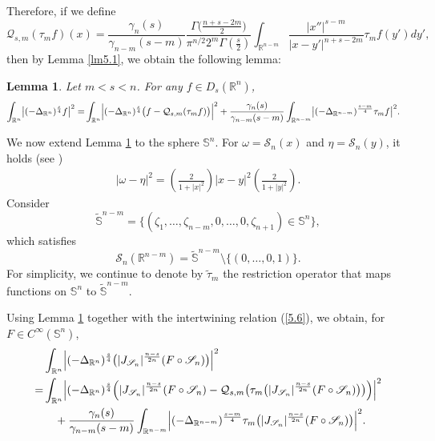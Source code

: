\documentclass[12pt,reqno]{amsart}%
\theoremstyle{plain}
\newtheorem{lemma}{Lemma}[section]
\numberwithin{equation}{section}
\begin{document}
Therefore, if we define
\[
\mathcal{Q}_{s,m}(\tau_{m}f)(x)=\frac{\gamma_{n}(s)}{\gamma_{n-m}(s-m)}
\frac{\Gamma\bigl(\frac{n+s-2m}{2}\bigr)}{\pi^{n/2}2^{m}\Gamma(\frac{s}{2})}
\int_{\mathbb{R}^{n-m}}\frac{|x''|^{s-m}}{|x-y'|^{n+s-2m}}
\tau_{m}f(y')dy',
\]
then by Lemma \ref{lm5.1}, we obtain the following lemma:
\begin{lemma}\label{lm5.2}
Let \(m<s< n\). For any \(f\in D_{s}(\mathbb{R}^{n})\),
\begin{align*}
\int_{\mathbb{R}^{n}}\bigl|(-\Delta_{\mathbb{R}^{n}})^{\frac{s}{4}}f\bigr|^{2}
=& \int_{\mathbb{R}^{n}}\Bigl|(-\Delta_{\mathbb{R}^{n}})^{\frac{s}{4}}\bigl(f-
\mathcal{Q}_{s,m}(\tau_{m}f)\bigr)\Bigr|^{2}
+ \frac{\gamma_{n}(s)}{\gamma_{n-m}(s-m)}
\int_{\mathbb{R}^{n-m}}\bigl|(-\Delta_{\mathbb{R}^{n-m}})^{\frac{s-m}{4}}\tau_{m}f\bigr|^{2}.
\end{align*}
\end{lemma}

We now extend Lemma \ref{lm5.2} to the sphere \(\mathbb{S}^{n}\).
For \(\omega = \mathscr{S}_{n}(x)\) and \(\eta = \mathscr{S}_{n}(y)\), it holds (see \cite{lieb2})
\begin{align}\label{5.5}
|\omega - \eta|^2 = \left( \frac{2}{1+|x|^2} \right) |x - y|^2 \left( \frac{2}{1+|y|^2} \right).
\end{align}
Consider
\[
\widetilde{\mathbb{S}}^{n-m}
= \bigl\{(\zeta_{1},\dots,\zeta_{n-m},0,\dots,0,\zeta_{n+1})\in \mathbb{S}^{n} \bigr\},
\]
which satisfies
\[
\mathscr{S}_{n}(\mathbb{R}^{n-m}) = \widetilde{\mathbb{S}}^{n-m}\setminus\{(0,\dots,0,1)\}.
\]
For simplicity, we continue to denote by \(\widetilde{\tau}_{m}\) the restriction operator that maps  functions  on \(\mathbb{S}^{n}\) to \(\widetilde{\mathbb{S}}^{n-m}\).

 Using Lemma \ref{lm5.2} together with the intertwining relation (\ref{5.6}), we obtain, for $F\in C^{\infty}(\mathbb{S}^{n})$,
\begin{align*}
&\int_{\mathbb{R}^{n}}\Bigl|(-\Delta_{\mathbb{R}^{n}})^{\frac{s}{4}}\bigl( |J_{\mathscr{S}_{n}}|^{\frac{n-s}{2n}} (F \circ \mathscr{S}_{n}) \bigr)\Bigr|^{2}\\
=& \int_{\mathbb{R}^{n}}\Bigl|(-\Delta_{\mathbb{R}^{n}})^{\frac{s}{4}}\Bigl( |J_{\mathscr{S}_{n}}|^{\frac{n-s}{2n}} (F \circ \mathscr{S}_{n}) -
\mathcal{Q}_{s,m}\bigl(\tau_{m}\bigl( |J_{\mathscr{S}_{n}}|^{\frac{n-s}{2n}} (F \circ \mathscr{S}_{n}) \bigr)\bigr)\Bigr)\Bigr|^{2}\\
&\quad + \frac{\gamma_{n}(s)}{\gamma_{n-m}(s-m)}
\int_{\mathbb{R}^{n-m}}\Bigl|(-\Delta_{\mathbb{R}^{n-m}})^{\frac{s-m}{4}}
\tau_{m}\bigl( |J_{\mathscr{S}_{n}}|^{\frac{n-s}{2n}} (F \circ \mathscr{S}_{n}) \bigr)\Bigr|^{2}.
\end{align*}
\end{document}
